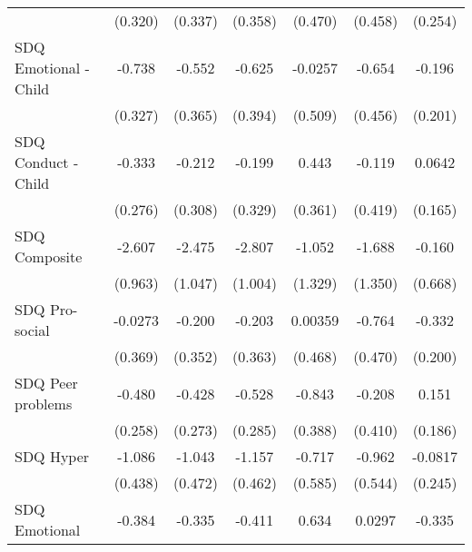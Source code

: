 {\begin{tabular}{l*{6}{c}}
            &     (0.320)         &     (0.337)         &     (0.358)         &     (0.470)         &     (0.458)         &     (0.254)         \\
\addlinespace
SDQ Emotional - Child&      -0.738\sym{*}  &      -0.552         &      -0.625         &     -0.0257         &      -0.654         &      -0.196         \\
            &     (0.327)         &     (0.365)         &     (0.394)         &     (0.509)         &     (0.456)         &     (0.201)         \\
\addlinespace
SDQ Conduct - Child&      -0.333         &      -0.212         &      -0.199         &       0.443         &      -0.119         &      0.0642         \\
            &     (0.276)         &     (0.308)         &     (0.329)         &     (0.361)         &     (0.419)         &     (0.165)         \\
\addlinespace
SDQ Composite&      -2.607\sym{**} &      -2.475\sym{*}  &      -2.807\sym{**} &      -1.052         &      -1.688         &      -0.160         \\
            &     (0.963)         &     (1.047)         &     (1.004)         &     (1.329)         &     (1.350)         &     (0.668)         \\
\addlinespace
SDQ Pro-social&     -0.0273         &      -0.200         &      -0.203         &     0.00359         &      -0.764         &      -0.332         \\
            &     (0.369)         &     (0.352)         &     (0.363)         &     (0.468)         &     (0.470)         &     (0.200)         \\
\addlinespace
SDQ Peer problems&      -0.480         &      -0.428         &      -0.528         &      -0.843\sym{*}  &      -0.208         &       0.151         \\
            &     (0.258)         &     (0.273)         &     (0.285)         &     (0.388)         &     (0.410)         &     (0.186)         \\
\addlinespace
SDQ Hyper   &      -1.086\sym{*}  &      -1.043\sym{*}  &      -1.157\sym{*}  &      -0.717         &      -0.962         &     -0.0817         \\
            &     (0.438)         &     (0.472)         &     (0.462)         &     (0.585)         &     (0.544)         &     (0.245)         \\
\addlinespace
SDQ Emotional&      -0.384         &      -0.335         &      -0.411         &       0.634         &      0.0297         &      -0.335         \\

\end{tabular}}
